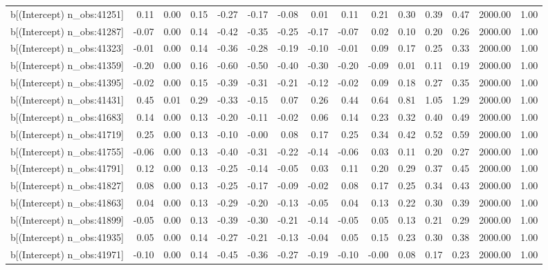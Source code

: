 \begin{table}[ht]
\begin{tabular}{rrrrrrrrrrrrrrr}
  b[(Intercept) n\_obs:41251] & 0.11 & 0.00 & 0.15 & -0.27 & -0.17 & -0.08 & 0.01 & 0.11 & 0.21 & 0.30 & 0.39 & 0.47 & 2000.00 & 1.00 \\ 
  b[(Intercept) n\_obs:41287] & -0.07 & 0.00 & 0.14 & -0.42 & -0.35 & -0.25 & -0.17 & -0.07 & 0.02 & 0.10 & 0.20 & 0.26 & 2000.00 & 1.00 \\ 
  b[(Intercept) n\_obs:41323] & -0.01 & 0.00 & 0.14 & -0.36 & -0.28 & -0.19 & -0.10 & -0.01 & 0.09 & 0.17 & 0.25 & 0.33 & 2000.00 & 1.00 \\ 
  b[(Intercept) n\_obs:41359] & -0.20 & 0.00 & 0.16 & -0.60 & -0.50 & -0.40 & -0.30 & -0.20 & -0.09 & 0.01 & 0.11 & 0.19 & 2000.00 & 1.00 \\ 
  b[(Intercept) n\_obs:41395] & -0.02 & 0.00 & 0.15 & -0.39 & -0.31 & -0.21 & -0.12 & -0.02 & 0.09 & 0.18 & 0.27 & 0.35 & 2000.00 & 1.00 \\ 
  b[(Intercept) n\_obs:41431] & 0.45 & 0.01 & 0.29 & -0.33 & -0.15 & 0.07 & 0.26 & 0.44 & 0.64 & 0.81 & 1.05 & 1.29 & 2000.00 & 1.00 \\ 
  b[(Intercept) n\_obs:41683] & 0.14 & 0.00 & 0.13 & -0.20 & -0.11 & -0.02 & 0.06 & 0.14 & 0.23 & 0.32 & 0.40 & 0.49 & 2000.00 & 1.00 \\ 
  b[(Intercept) n\_obs:41719] & 0.25 & 0.00 & 0.13 & -0.10 & -0.00 & 0.08 & 0.17 & 0.25 & 0.34 & 0.42 & 0.52 & 0.59 & 2000.00 & 1.00 \\ 
  b[(Intercept) n\_obs:41755] & -0.06 & 0.00 & 0.13 & -0.40 & -0.31 & -0.22 & -0.14 & -0.06 & 0.03 & 0.11 & 0.20 & 0.27 & 2000.00 & 1.00 \\ 
  b[(Intercept) n\_obs:41791] & 0.12 & 0.00 & 0.13 & -0.25 & -0.14 & -0.05 & 0.03 & 0.11 & 0.20 & 0.29 & 0.37 & 0.45 & 2000.00 & 1.00 \\ 
  b[(Intercept) n\_obs:41827] & 0.08 & 0.00 & 0.13 & -0.25 & -0.17 & -0.09 & -0.02 & 0.08 & 0.17 & 0.25 & 0.34 & 0.43 & 2000.00 & 1.00 \\ 
  b[(Intercept) n\_obs:41863] & 0.04 & 0.00 & 0.13 & -0.29 & -0.20 & -0.13 & -0.05 & 0.04 & 0.13 & 0.22 & 0.30 & 0.39 & 2000.00 & 1.00 \\ 
  b[(Intercept) n\_obs:41899] & -0.05 & 0.00 & 0.13 & -0.39 & -0.30 & -0.21 & -0.14 & -0.05 & 0.05 & 0.13 & 0.21 & 0.29 & 2000.00 & 1.00 \\ 
  b[(Intercept) n\_obs:41935] & 0.05 & 0.00 & 0.14 & -0.27 & -0.21 & -0.13 & -0.04 & 0.05 & 0.15 & 0.23 & 0.30 & 0.38 & 2000.00 & 1.00 \\ 
  b[(Intercept) n\_obs:41971] & -0.10 & 0.00 & 0.14 & -0.45 & -0.36 & -0.27 & -0.19 & -0.10 & -0.00 & 0.08 & 0.17 & 0.23 & 2000.00 & 1.00 \\ 

\end{tabular}
\end{table}

